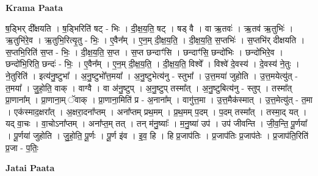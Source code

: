 \documentclass[17pt]{extarticle}
\begin{document}
\textbf{Krama Paata} \newline

ष॒ड्भिर् दी᳚क्षयति । ष॒ड्भिरिति॑ षट् - भिः । दी॒क्ष॒य॒ति॒ षट् । षड् वै । वा ऋ॒तवः॑ । ऋ॒तव॑ ऋ॒तुभिः॑ । ऋ॒तुभि॑रे॒व । ऋ॒तुभि॒रित्यृ॒तु - भिः॒ । ए॒वैन᳚म् । ए॒न॒म् दी॒क्ष॒य॒ति॒ । दी॒क्ष॒य॒ति॒ स॒प्तभिः॑ । स॒प्तभि॑र् दीक्षयति । स॒प्तभि॒रिति॑ स॒प्त - भिः॒ । दी॒क्ष॒य॒ति॒ स॒प्त । स॒प्त छन्दाꣳ॑सि । छन्दाꣳ॑सि॒ छन्दो॑भिः । छन्दो॑भिरे॒व । छन्दो॑भि॒रिति॒ छन्दः॑ - भिः॒ । ए॒वैन᳚म् । ए॒न॒म् दी॒क्ष॒य॒ति॒ । दी॒क्ष॒य॒ति॒ विश्वे᳚ । विश्वे॑ दे॒वस्य॑ । दे॒वस्य॑ ने॒तुः । ने॒तुरिति॑ । इत्य॑नु॒ष्टुभा᳚ । अ॒नु॒ष्टुभो᳚त्त॒मया᳚ । अ॒नु॒ष्टुभेत्य॑नु - स्तुभा᳚ । उ॒त्त॒मया॑ जुहोति । उ॒त्त॒मयेत्यु॑त् - त॒मया᳚ । जु॒हो॒ति॒ वाक् । वाग्वै । वा अ॑नु॒ष्टुप् । अ॒नु॒ष्टुप् तस्मा᳚त् । अ॒नु॒ष्टुबित्य॑नु - स्तुप् । तस्मा᳚त् प्रा॒णाना᳚म् । प्रा॒णाना॒म् ॅवाक् । प्रा॒णाना॒मिति॑ प्र - अ॒नाना᳚म् । वागु॑त्त॒मा । उ॒त्त॒मैक॑स्मात् । उ॒त्त॒मेत्यु॑त् - त॒मा । एक॑स्माद॒क्षरा᳚त् । अ॒क्षरा॒दना᳚प्तम् । अना᳚प्तम् प्रथ॒मम् । प्र॒थ॒मम् प॒दम् । प॒दम् तस्मा᳚त् । तस्मा॒द् यत् । यद् वा॒चः । वा॒चोऽना᳚प्तम् । अना᳚प्त॒म् तत् । तन् म॑नु॒ष्याः᳚ । म॒नु॒ष्या॑ उप॑ । उप॑ जीवन्ति । जी॒व॒न्ति॒ पू॒र्णया᳚ । पू॒र्णया॑ जुहोति । जु॒हो॒ति॒ पू॒र्णः । पू॒र्ण इ॑व । इ॒व॒ हि । हि प्र॒जाप॑तिः । प्र॒जाप॑तिः प्र॒जाप॑तेः । प्र॒जाप॑ति॒रिति॑ प्र॒जा - प॒तिः॒ \newline

\textbf{Jatai Paata} \newline
\end{document}
